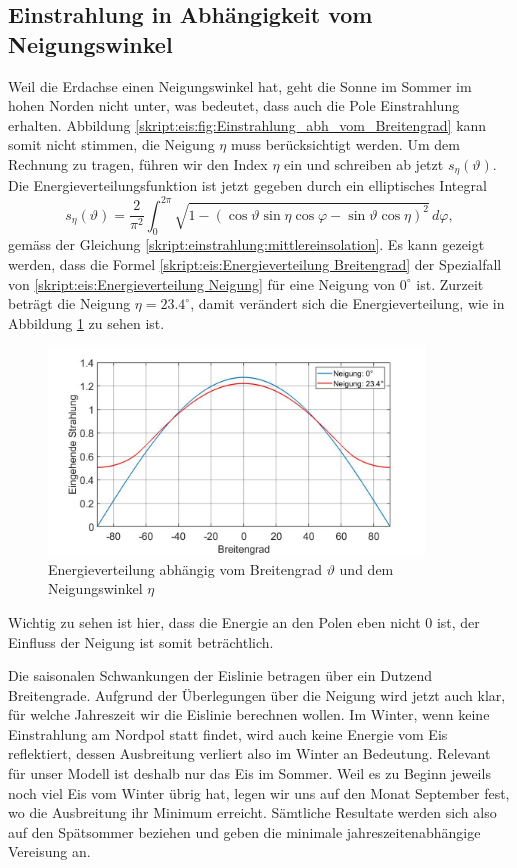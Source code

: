 \begin{refsection}
\subsection{Einstrahlung in Abhängigkeit vom Neigungswinkel}
Weil die Erdachse einen Neigungswinkel hat, geht die Sonne im Sommer im hohen Norden nicht unter, was bedeutet, dass auch die Pole Einstrahlung erhalten. Abbildung \ref{skript:eis:fig:Einstrahlung_abh_vom_Breitengrad} kann somit nicht stimmen, die Neigung $\eta$ muss berücksichtigt werden. Um dem Rechnung zu tragen, führen wir den Index $\eta$ ein und schreiben ab jetzt $s_{\eta}(\vartheta)$. Die Energieverteilungsfunktion ist jetzt gegeben durch ein elliptisches Integral
\begin{equation}\label{skript:eis:Energieverteilung Neigung}
s_{\eta}(\vartheta)
=
\frac{2}{\pi^2}\int_{0}^{2\pi}\sqrt{1-(\cos\vartheta\sin\eta \cos\varphi-\sin\vartheta \cos\eta)^2}\,d\varphi,
\end{equation}
gemäss der Gleichung \eqref{skript:einstrahlung:mittlereinsolation}. Es kann gezeigt werden, dass die Formel \eqref{skript:eis:Energieverteilung Breitengrad} der Spezialfall von \eqref{skript:eis:Energieverteilung Neigung} für eine Neigung von $0^{\circ}$ ist. Zurzeit beträgt die Neigung $\eta=23.4^{\circ}$, damit verändert sich die Energieverteilung, wie in Abbildung \ref{skript:eis:fig:Einstrahlung_abh_mit_und_ohne_Neigung} zu sehen ist.
\begin{figure}
	\centering
	\includegraphics[width=10cm]{eis/Einstrahlung_abh_mit_und_ohne_Neigung.jpg}
	\caption{Energieverteilung abhängig vom Breitengrad $\vartheta$ und dem Neigungswinkel $\eta$}
	\label{skript:eis:fig:Einstrahlung_abh_mit_und_ohne_Neigung}
\end{figure}
Wichtig zu sehen ist hier, dass die Energie an den Polen eben nicht $0$ ist, der Einfluss der Neigung ist somit beträchtlich.

Die saisonalen Schwankungen der Eislinie betragen über ein Dutzend Breitengrade. Aufgrund der Überlegungen über die Neigung wird jetzt auch klar, für welche Jahreszeit wir die Eislinie berechnen wollen. Im Winter, wenn keine Einstrahlung am Nordpol statt findet, wird auch keine Energie vom Eis reflektiert, dessen Ausbreitung verliert also im Winter an Bedeutung. Relevant für unser Modell ist deshalb nur das Eis im Sommer. Weil es zu Beginn jeweils noch viel Eis vom Winter übrig hat, legen wir uns auf den Monat September fest, wo die Ausbreitung ihr Minimum erreicht. Sämtliche Resultate werden sich also auf den Spätsommer beziehen und geben die minimale jahreszeitenabhängige Vereisung an.

\end{refsection}
